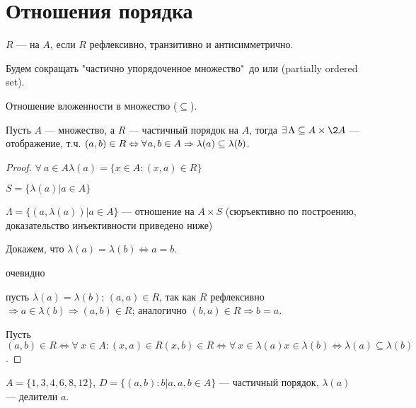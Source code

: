 \section{Отношения порядка}\label{sec:ch-2-sec-4}


\begin{definition}
    $R$ ---  на $A$, если $R$ рефлексивно, транзитивно и антисимметрично.
\end{definition}

\begin{sh-designation}
    Будем сокращать "частично упорядоченное множество"\ до  или  (partially ordered set).
\end{sh-designation}

\begin{sh-example}
    Отношение вложенности в множество ($\subseteq$).
\end{sh-example}

\begin{theorem}
    Пусть $A$ --- множество, а $R$ --- частичный порядок на $A$, тогда $\exists \Lambda \subseteq A \times \2{A}$ --- отображение, т.ч. $(a, b) \in R \iff \forall a, b \in A \imp \lambda(a) \subseteq \lambda(b)$.
\end{theorem}

\begin{proof}
    $\forall ~a \in A \lambda(a) = \{x \in A : (x, a) \in R\}$

    \quad $S = \{\lambda(a) | a \in A\}$

    \quad $\Lambda = \{(a, \lambda(a)) | a \in A\}$ --- отношение на $A \times S$ (сюръективно по построению, доказательство инъективности приведено ниже)

    Докажем, что $\lambda(a) = \lambda(b) \Leftrightarrow a = b$.

    \fbox{$\Leftarrow$} очевидно

    \fbox{$\Rightarrow$} пусть $\lambda(a) = \lambda(b)$; $(a, a) \in R$, так как $R$ рефлексивно $\Rightarrow a \in \lambda(b) \Rightarrow (a, b) \in R$; аналогично $(b, a) \in R \Rightarrow b = a$.

    Пусть $(a, b) \in R \Leftrightarrow \forall ~x \in A: (x, a) \in R (x, b) \in R \Leftrightarrow \forall ~x \in \lambda(a) x \in \lambda(b) \Leftrightarrow \lambda(a) \subseteq \lambda(b)$.
\end{proof}


\begin{sh-example}
    $A = \{1, 3, 4, 6, 8, 12\}$, $D = \{(a, b): b | a, a, b \in A\}$ --- частичный порядок, $\lambda(a)$ --- делители $a$.
\end{sh-example}

